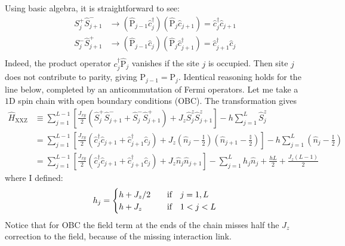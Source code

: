 Using basic algebra, it is straightforward to see:
\[
	\begin{aligned}
		S_j^+ \hat S_{j+1}^- &\to \left(
			\hat{\mathrm{P}}_{j-1} \hat c_j^\dagger
		\right) \left(
			\hat{\mathrm{P}}_j \hat c_{j+1}
		\right) = \hat c_j^\dagger \hat c_{j+1} \\
		S_j^- \hat S_{j+1}^+ &\to \left(
			\hat{\mathrm{P}}_{j-1} \hat c_j
		\right) \left(
			\hat{\mathrm{P}}_j \hat c_{j+1}^\dagger
		\right) = \hat c_{j+1}^\dagger \hat c_j \\
	\end{aligned}
\]
Indeed, the product operator $c_j^\dagger \hat{\mathrm{P}}_j$ vanishes if the site $j$ is occupied. Then site $j$ does not contribute to parity, giving $\mathrm{P}_{j-1}=\mathrm{P}_j$. Identical reasoning holds for the line below, completed by an anticommutation of Fermi operators. Let me take a $1\mathrm{D}$ spin chain with open boundary conditions (OBC). The transformation gives
\[
	\begin{aligned}
		\hat H_\mathrm{XXZ} &\equiv \sum_{j=1}^{L-1} \left[
			\frac{J_{xy}}{2} \left( 
				\hat S_j^+ \hat S_{j+1}^- + \hat S_j^- \hat S_{j+1}^+
			\right) + J_z \hat S_j^z \hat S_{j+1}^z
		\right] - h \sum_{j=1}^L \hat S_j^z \\
		&= \sum_{j=1}^{L-1} \left[
			\frac{J_{xy}}{2} \left(
				\hat c_j^\dagger \hat c_{j+1} + \hat c_{j+1}^\dagger \hat c_j
			\right) + J_z \left(
				\hat n_j - \frac{\mathbb{I}}{2}
			\right) \left(
				\hat n_{j+1} - \frac{\mathbb{I}}{2}
			\right)
		\right] - h \sum_{j=1}^L \left(
			\hat n_{j} - \frac{\mathbb{I}}{2}
		\right) \\
		&= \sum_{j=1}^{L-1} \left[
			\frac{J_{xy}}{2} \left(
				\hat c_j^\dagger \hat c_{j+1} + \hat c_{j+1}^\dagger \hat c_j
			\right) + J_z \hat n_j \hat n_{j+1}
		\right] - \sum_{j=1}^L h_j \hat n_{j}
		+ \frac{hL}{2} + \frac{J_z (L-1)}{2}
	\end{aligned}
\]
where I defined:
\[
	h_j = \begin{cases}
		h + J_z/2 &\qq{if} j=1,L \\
		h + J_z &\qq{if} 1<j<L
	\end{cases}
\]
Notice that for OBC the field term at the ends of the chain misses half the $J_z$ correction to the field, because of the missing interaction link.

